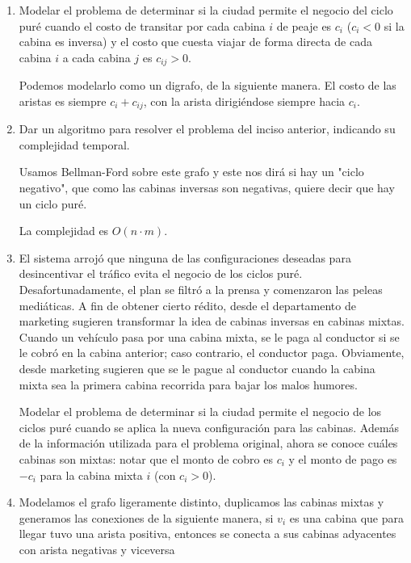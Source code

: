 \documentclass{article}
\begin{document}
\begin{enumerate}
    \item Modelar el problema de determinar si la ciudad permite el negocio del ciclo puré cuando el costo de transitar por cada cabina $i$ de peaje es $c_i$ ($c_i < 0$ si la cabina es inversa) y el costo que cuesta viajar de forma directa de cada cabina $i$ a cada cabina $j$ es $c_{ij} > 0$.
    
    Podemos modelarlo como un digrafo, de la siguiente manera. El costo de las aristas es siempre $c_i + c_{ij}$, con la arista dirigiéndose siempre hacia $c_i$.
    
    \item Dar un algoritmo para resolver el problema del inciso anterior, indicando su complejidad temporal.
    
    Usamos Bellman-Ford sobre este grafo y este nos dirá si hay un "ciclo negativo", que como las cabinas inversas son negativas, quiere decir que hay un ciclo puré.
    
    La complejidad es $O(n \cdot m)$.
    
    \item El sistema arrojó que ninguna de las configuraciones deseadas para desincentivar el tráfico evita el negocio de los ciclos puré. Desafortunadamente, el plan se filtró a la prensa y comenzaron las peleas mediáticas. A fin de obtener cierto rédito, desde el departamento de marketing sugieren transformar la idea de cabinas inversas en cabinas mixtas. Cuando un vehículo pasa por una cabina mixta, se le paga al conductor si se le cobró en la cabina anterior; caso contrario, el conductor paga. Obviamente, desde marketing sugieren que se le pague al conductor cuando la cabina mixta sea la primera cabina recorrida para bajar los malos humores.
    
    Modelar el problema de determinar si la ciudad permite el negocio de los ciclos puré cuando se aplica la nueva configuración para las cabinas. Además de la información utilizada para el problema original, ahora se conoce cuáles cabinas son mixtas: notar que el monto de cobro es $c_i$ y el monto de pago es $-c_i$ para la cabina mixta $i$ (con $c_i > 0$).

	\item Modelamos el grafo ligeramente distinto, duplicamos las cabinas mixtas y generamos las conexiones de la siguiente manera, si $v_i$ es una cabina que para llegar tuvo una arista positiva, entonces se conecta a sus cabinas adyacentes con arista negativas y viceversa

\end{enumerate}
\end{document}
